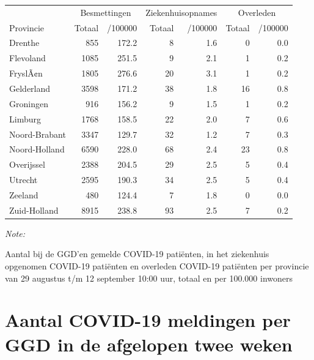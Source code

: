 \documentclass[
  english,
  man,floatsintext]{apa6}
\begin{document}
\begin{table}
\centering
\begin{threeparttable}
\begin{tabular}{lrrrrrr}
\toprule
\multicolumn{1}{c}{ } & \multicolumn{2}{c}{Besmettingen} & \multicolumn{2}{c}{Ziekenhuisopnames} & \multicolumn{2}{c}{Overleden} \\
\cmidrule(l{3pt}r{3pt}){2-3} \cmidrule(l{3pt}r{3pt}){4-5} \cmidrule(l{3pt}r{3pt}){6-7}
Provincie & Totaal & /100000 & Totaal & /100000 & Totaal & /100000\\
\midrule
Drenthe & 855 & 172.2 & 8 & 1.6 & 0 & 0.0\\
Flevoland & 1085 & 251.5 & 9 & 2.1 & 1 & 0.2\\
FryslÃ¢n & 1805 & 276.6 & 20 & 3.1 & 1 & 0.2\\
Gelderland & 3598 & 171.2 & 38 & 1.8 & 16 & 0.8\\
Groningen & 916 & 156.2 & 9 & 1.5 & 1 & 0.2\\
Limburg & 1768 & 158.5 & 22 & 2.0 & 7 & 0.6\\
Noord-Brabant & 3347 & 129.7 & 32 & 1.2 & 7 & 0.3\\
Noord-Holland & 6590 & 228.0 & 68 & 2.4 & 23 & 0.8\\
Overijssel & 2388 & 204.5 & 29 & 2.5 & 5 & 0.4\\
Utrecht & 2595 & 190.3 & 34 & 2.5 & 5 & 0.4\\
Zeeland & 480 & 124.4 & 7 & 1.8 & 0 & 0.0\\
Zuid-Holland & 8915 & 238.8 & 93 & 2.5 & 7 & 0.2\\
\bottomrule
\end{tabular}
\begin{tablenotes}
\item \textit{Note: } 
\item Aantal bij de GGD’en gemelde COVID-19 patiënten, in het ziekenhuis opgenomen COVID-19 patiënten en overleden COVID-19 patiënten per provincie van 29 augustus t/m 12 september 10:00 uur, totaal en per 100.000 inwoners
\end{tablenotes}
\end{threeparttable}
\end{table}

\newpage

\hypertarget{aantal-covid-19-meldingen-per-ggd-in-de-afgelopen-twee-weken}{%
\section{Aantal COVID-19 meldingen per GGD in de afgelopen twee weken}\label{aantal-covid-19-meldingen-per-ggd-in-de-afgelopen-twee-weken}}
\end{document}

